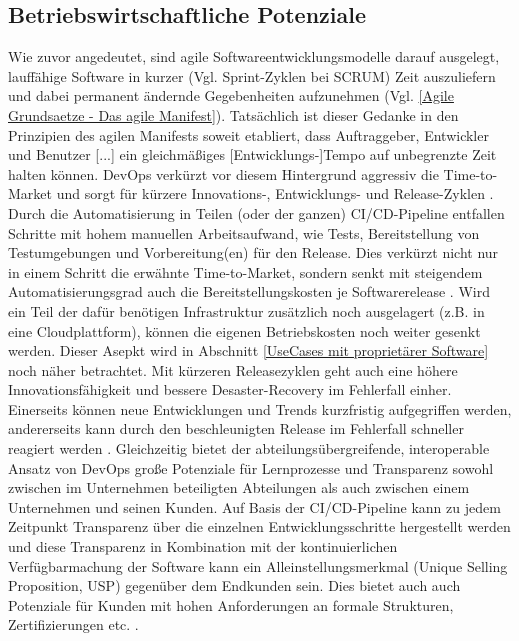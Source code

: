 \subsection{Betriebswirtschaftliche Potenziale}
\label{Betriebswirtschaftliche Potenziale}
Wie zuvor angedeutet, sind agile Softwareentwicklungsmodelle darauf ausgelegt, lauffähige Software in kurzer (Vgl. Sprint-Zyklen bei \gls{SCRUM}) Zeit auszuliefern und dabei permanent ändernde Gegebenheiten aufzunehmen (Vgl. \ref{Agile Grundsaetze - Das agile Manifest}). Tatsächlich ist dieser Gedanke in den Prinzipien des agilen Manifests soweit etabliert, dass \glqq Auftraggeber, Entwickler und Benutzer [...] ein gleichmäßiges [Entwicklungs-]Tempo auf unbegrenzte Zeit halten können\grqq{}\cite{beck_prinzipien_2001}.\newline
\gls{DevOps} verkürzt vor diesem Hintergrund aggressiv die \gls{Time-to-Market} und sorgt für kürzere Innovations-, Entwicklungs- und Release-Zyklen \cite{forsgren_devops_2015}. Durch die Automatisierung in Teilen (oder der ganzen) \acrshort{CI}/\acrshort{CD}-Pipeline entfallen Schritte mit hohem manuellen Arbeitsaufwand, wie Tests, Bereitstellung von Testumgebungen und Vorbereitung(en) für den Release. Dies verkürzt nicht nur in einem Schritt die erwähnte \gls{Time-to-Market}, sondern senkt mit steigendem Automatisierungsgrad auch die Bereitstellungskosten je Softwarerelease \cite{forsgren_devops_2015}.
Wird ein Teil der dafür benötigen Infrastruktur zusätzlich noch ausgelagert (z.B. in eine Cloudplattform), können die eigenen Betriebskosten noch weiter gesenkt werden. Dieser Asepkt wird in Abschnitt \ref{UseCases mit proprietärer Software} noch näher betrachtet.\newline
Mit kürzeren Releasezyklen geht auch eine höhere Innovationsfähigkeit und bessere Desaster-Recovery im Fehlerfall einher. Einerseits können neue Entwicklungen und Trends kurzfristig aufgegriffen werden, andererseits kann durch den beschleunigten Release im Fehlerfall schneller reagiert werden \cite{forsgren_devops_2015}.
Gleichzeitig bietet der abteilungsübergreifende, interoperable Ansatz von \gls{DevOps} große Potenziale für Lernprozesse und Transparenz sowohl zwischen im Unternehmen beteiligten Abteilungen als auch zwischen einem Unternehmen und seinen Kunden.
Auf Basis der \acrshort{CI}/\acrshort{CD}-Pipeline kann zu jedem Zeitpunkt Transparenz über die einzelnen Entwicklungsschritte hergestellt werden und diese Transparenz in Kombination mit der kontinuierlichen Verfügbarmachung der Software kann ein Alleinstellungsmerkmal (Unique Selling Proposition, \acrshort{USP}) gegenüber dem Endkunden sein. Dies bietet auch auch Potenziale für Kunden mit hohen Anforderungen an formale Strukturen, Zertifizierungen etc. \cite[Kap. 7.2]{leite_survey_2020}.